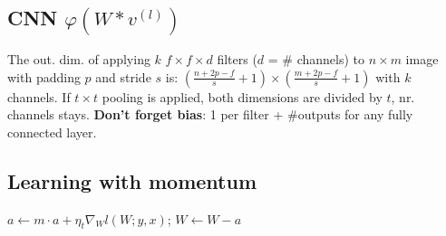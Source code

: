 \subsection*{CNN \quad \color{black}$\varphi(W * v^{(l)})$}

The out. dim. of applying $k$ $f \times f \times d$ filters (\(d\) = \# channels) to 
$n \times m$ image with padding $p$ and stride $s$ is: 
$\left(\frac{n+2p-f}{s}+1\right) \times \left(\frac{m+2p-f}{s}+1\right)$ with \(k\) channels.
If \(t\times t\) pooling is applied, both dimensions are divided by \(t\), nr. channels stays.
\textbf{Don't forget bias}: 1 per filter + \#outputs for any fully connected layer.

\subsection*{Learning with momentum}
$a \leftarrow m \cdot a + \eta_t \nabla_W l(W;y,x)$; $W \leftarrow W - a$